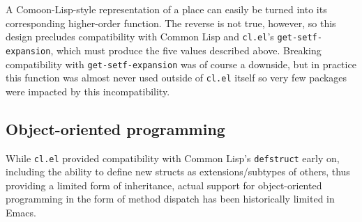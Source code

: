 \documentclass[format=acmsmall, review]{acmart}
\begin{document}
A Comoon-Lisp-style representation of a place can easily be turned into
its corresponding higher-order function.  The reverse is not true, however, so
this design precludes compatibility with Common Lisp and
\texttt{cl.el}'s \texttt{get-setf-expansion}, which must produce the
five values described above.
Breaking compatibility with \texttt{get-setf-expansion}
was of course
a downside, but in practice this function was almost never used outside of
\texttt{cl.el} itself so very few packages were impacted by
this incompatibility.


\subsection{Object-oriented programming} %
\label{sec:oop}

While \texttt{cl.el} provided compatibility with Common
Lisp's \texttt{defstruct} early on, including the
ability to define new structs as extensions/subtypes of others, thus
providing a limited form of inheritance, actual support for object-oriented
programming in the form of method dispatch has been historically limited
in Emacs.
\end{document}
